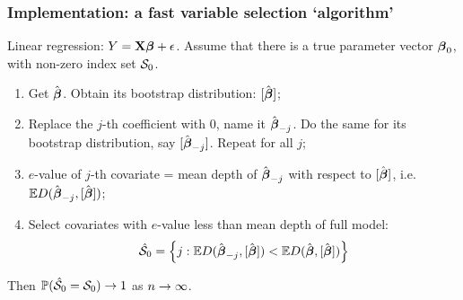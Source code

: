 \documentclass[handout,10pt]{beamer}
\begin{document}
\begin{frame}[fragile]
\frametitle{Implementation: a fast variable selection `algorithm'}

\begin{minipage}[b]{.6\textwidth}

Linear regression: $Y = {\mathbf{X}} {\boldsymbol{\beta}} + \epsilon$. Assume that there is a true parameter vector ${\boldsymbol{\beta}}_0$, with non-zero index set ${\cal{S}}_0$.

\vspace{1em}


\begin{enumerate}
\item Get $\hat {{\boldsymbol{\beta}}}$. Obtain its bootstrap distribution: $[\hat {{\boldsymbol{\beta}}}]$;

\item Replace the $j$-th coefficient with 0, name it $\hat {{\boldsymbol{\beta}}}_{-j}$. Do the same for its bootstrap distribution, say $[\hat {{\boldsymbol{\beta}}}_{-j}]$. Repeat for all $j$;

\item $e$-value of $j$-th covariate = mean depth of $\hat {{\boldsymbol{\beta}}}_{-j}$ with respect to $[ \hat {{\boldsymbol{\beta}}}]$, i.e. ${\mathbb{E}} D( \hat {{\boldsymbol{\beta}}}_{-j}, [ \hat {{\boldsymbol{\beta}}}])$;

\item Select covariates with $e$-value less than mean depth of full model:
%
$$
\hat {{\cal{S}}}_0 = \left\{ j: {\mathbb{E}} D( \hat {{\boldsymbol{\beta}}}_{-j}, [ \hat {{\boldsymbol{\beta}}}]) < {\mathbb{E}} D( \hat {{\boldsymbol{\beta}}}, [ \hat {{\boldsymbol{\beta}}}]) \right\}
$$
%
\end{enumerate}

Then ${\mathbb{P}} (\hat {{\cal{S}}}_0 = {\cal{S}}_0 ) \rightarrow 1$ as $n \rightarrow \infty$.


\end{minipage}
\end{frame}
\end{document}
